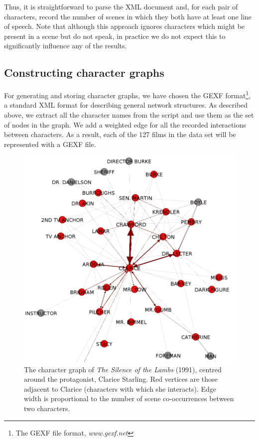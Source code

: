 \documentclass[bsc,frontabs,deptreport,singlespacing,parskip, twoside]{infthesis}
\begin{document}
Thus, it is straightforward to parse the XML document and, for each pair of characters, record the number of scenes in which they both have at least one line of speech. Note that although this approach ignores characters which might be present in a scene but do not speak, in practice we do not expect this to significantly influence any of the results.

\subsection{Constructing character graphs}
For generating and storing character graphs, we have chosen the GEXF format\footnote{The GEXF file format, \textit{www.gexf.net}}, a standard XML format for describing general network structures. As described above, we extract all the character names from the script and use them as the set of nodes in the graph. We add a weighted edge for all the recorded interactions between characters. As a result, each of the 127 films in the data set will be represented with a GEXF file.

\begin{figure}
	\centering
	\includegraphics[scale=0.4]{figures/clarice_graph}
	\caption{The character graph of \textit{The Silence of the Lambs} (1991), centred around the protagonist, Clarice Starling. Red vertices are those adjacent to Clarice (characters with which she interacts). Edge width is proportional to the number of scene co-occurrences between two characters.}
\end{figure}
\end{document}
